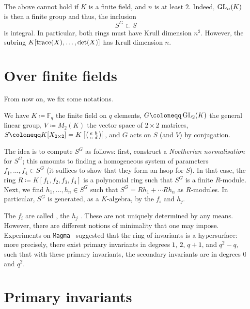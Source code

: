 \documentclass[12pt]{article}
\begin{document}
	The above cannot hold if $K$ is a finite field, and $n$ is at least $2$. 
	Indeed, $\operatorname{GL}_{n}(K)$ is then a finite group and thus, the inclusion
	\begin{equation*} 
		S^{G} \subset S
	\end{equation*}
	is integral. In particular, both rings must have Krull dimension $n^{2}$. 
	However, the subring $K[\operatorname{trace}(X), \ldots, \det(X)]$ has Krull dimension $n$.

\section{Over finite fields}
	
	From now on, we fix some notations.
	\begin{tcolorbox}
		We have $K \coloneqq \mathbb{F}_{q}$ the finite field on $q$ elements, 
		$G \coloneqq \GL_{2}(K)$ the general linear group, 
		$V \coloneqq M_{2}(K)$ the vector space of $2 \times 2$ matrices,
		$S \coloneqq K[X_{2 \times 2}] = K\left[\smatrix{a & b \\ c & d}\right]$, 
		and $G$ acts on $S$ (and $V$) by conjugation. 
	\end{tcolorbox}

	The idea is to compute $S^{G}$ as follows: 
	first, construct a \emph{Noetherian normalisation} for $S^{G}$; this amounts to finding a homogeneous system of parameters $f_{1}, \ldots, f_{4} \in S^{G}$ (it suffices to show that they form an hsop for $S$). 
	In that case, the ring $R \coloneqq K[f_{1}, f_{2}, f_{3}, f_{4}]$ is a polynomial ring such that $S^{G}$ is a finite $R$-module. 
	Next, we find $h_{1}, \ldots, h_{n} \in S^{G}$ such that $S^{G} = R h_{1} + \cdots R h_{n}$ as $R$-modules. 
	In particular, $S^{G}$ is generated, as a $K$-algebra, by the $f_{i}$ and $h_{j}$.

	The $f_{i}$ are called , the $h_{j}$ . 
	These are not uniquely determined by any means. 
	However, there are different notions of minimality that one may impose. 
	Experiments on \texttt{Magma}~\Cite{Magma} suggested that the ring of invariants is a hypersurface: more precisely, there exist primary invariants in degrees $1$, $2$, $q+1$, and $q^{2} - q$, such that with these primary invariants, the secondary invariants are in degrees $0$ and $q^{2}$.

\section{Primary invariants}
	
\end{document}
